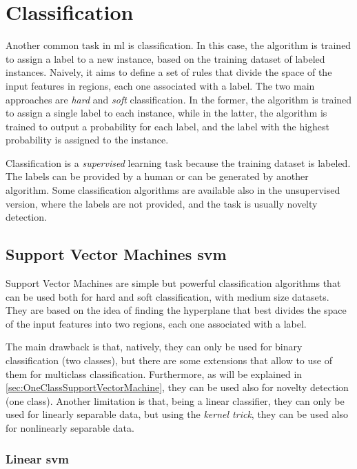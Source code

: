 \section{Classification}
\label{sec:Classification}
Another common task in \gls{ml} is classification. In this case, the algorithm is trained to assign a label to a new instance, based on the training dataset of labeled instances. Naively, it aims to define a set of rules that divide the space of the input features in regions, each one associated with a label. The two main approaches are \emph{hard} and \emph{soft} classification. In the former, the algorithm is trained to assign a single label to each instance, while in the latter, the algorithm is trained to output a probability for each label, and the label with the highest probability is assigned to the instance.

Classification is a \emph{supervised} learning task because the training dataset is labeled. The labels can be provided by a human or can be generated by another algorithm. Some classification algorithms are available also in the unsupervised version, where the labels are not provided, and the task is usually novelty detection.

\subsection{Support Vector Machines \gls{svm}}
\label{subsec:svm}
Support Vector Machines are simple but powerful classification algorithms that can be used both for hard and soft classification, with medium size datasets. They are based on the idea of finding the hyperplane that best divides the space of the input features into two regions, each one associated with a label.

The main drawback is that, natively, they can only be used for binary classification (two classes), but there are some extensions that allow to use of them for multiclass classification. Furthermore, as will be explained in \autoref{sec:OneClassSupportVectorMachine}, they can be used also for novelty detection (one class). Another limitation is that, being a linear classifier, they can only be used for linearly separable data, but using the \emph{kernel trick}, they can be used also for nonlinearly separable data.

\subsubsection{Linear \gls{svm}}
\label{subsubsec:LinearSVM}

